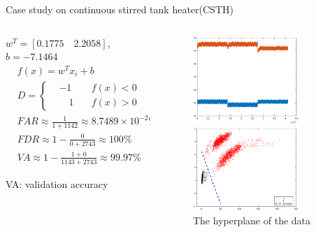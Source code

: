 \documentclass[10pt]{beamer}
\begin{document}
\begin{frame}{Case study on continuous stirred tank heater(CSTH)}
     \begin{columns}
             \begin{column}{0.5\textwidth}
 $w^T = [0.1775 \quad 2.2058]$,$b = -7.1464$
 \begin{equation} \nonumber
  \begin{aligned}
  & f(x) =  
 w^Tx_i+b  \\
  & D = \left\{
     \begin{aligned}
      &-1\quad &f(x)<0 \quad &\text{(fault-free)}  \\
      &\quad 1    \quad &f(x)>0 \quad &\text{(faulty)}
     \end{aligned}
  \right. 
    \end{aligned}
\end{equation}
\begin{equation} \nonumber
  \begin{aligned}
   & FAR \approx \frac{1}{1+1142} \approx  8.7489\times 10^{-2} \% \\
   & FDR \approx 1 - \frac{0}{0+2743} \approx 100 \% \\
   & VA \approx 1 - \frac{1+0}{1143+2743} \approx 99.97 \% 
  \end{aligned}
\end{equation}
   \par
  VA: validation accuracy
           \end{column}
        \begin{column}{0.5\textwidth}  %
   \begin{figure}
        \centering
        \includegraphics[width=4cm]{fig/csthrealdata.eps}
        \caption{data of CSTH}
        \includegraphics[width=4cm]{fig/Csthboundary.eps}
        \caption{The hyperplane of the data}
        \end{figure}
   
        \end{column}
    \end{columns}
\end{frame}
\end{document}
